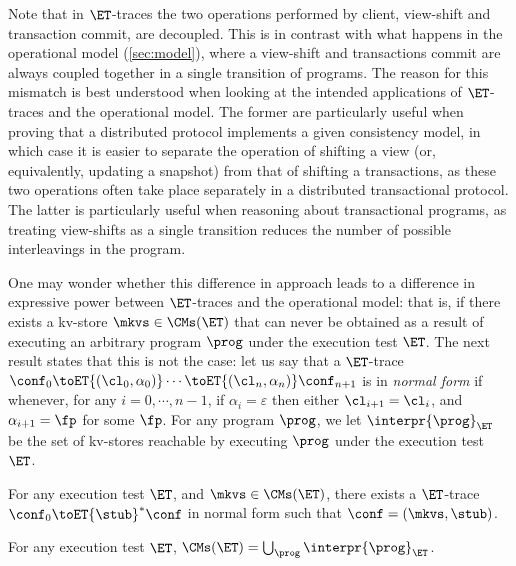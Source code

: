 Note that in $\ET$-traces the two operations performed by client, view-shift and 
transaction commit, are decoupled. This is in contrast with what happens in the operational model (\cref{sec:model}), 
where a view-shift and transactions commit are always coupled together in a single transition of programs. 
The reason for this mismatch is best understood when looking at the intended applications of 
$\ET$-traces and the operational model. The former are particularly useful when proving that a distributed 
protocol implements a given consistency model, in which case it is easier to separate the operation of shifting a view 
(or, equivalently, updating a snapshot) from that of shifting a transactions, as these two operations often take place 
separately in a distributed transactional protocol. The latter is particularly useful when reasoning about transactional 
programs, as treating view-shifts as a single transition reduces the number of possible interleavings in the program.

One may wonder whether this difference in approach leads to a difference in expressive power between $\ET$-traces 
and the operational model: that is, if there exists a kv-store $\mkvs \in \CMs(\ET)$ that can never be obtained as a 
result of executing an arbitrary program $\prog$ under the execution test $\ET$. The next result states that this is 
not the case: let us say that a $\ET$-trace  $\conf_{0} \toET{(\cl_{0}, \alpha_{0})} \cdots \toET{(\cl_{n}, \alpha_{n})} \conf_{n+1}$ is in \emph{normal form} if 
whenever, for any $i=0, \cdots, n-1$, if $\alpha_{i} = \varepsilon$ then either $\cl_{i+1} = \cl_{i}$, and $\alpha_{i+1} = \fp$ 
for some $\fp$. For any program $\prog$, we let $\interpr{\prog}_{\ET}$ be the set of 
kv-stores reachable by executing $\prog$ under the execution test $\ET$.

\begin{theorem}
For any execution test $\ET$, and $\mkvs \in \CMs(\ET)$, there exists a 
$\ET$-trace $\conf_{0} \toET{\stub}^{\ast} \conf$ in normal form such that 
$\conf = (\mkvs, \stub)$.
\end{theorem}

\begin{corollary}
For any execution test $\ET$, $\CMs(\ET) = \bigcup_{\prog} \interpr{\prog}_{\ET}$.
\end{corollary}

